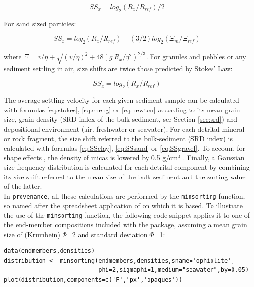 \documentclass{article}
\begin{document}
\begin{equation}
SS_x = log_2(R_x/R_{ref})/2
\label{eq:SSclay}
\end{equation}

For sand sized particles: 

\begin{equation}
SS_x = log_2(R_x/R_{ref}) - (3/2) log_2 (\Xi_m/\Xi_{ref})
\label{eq:SSsand}
\end{equation}

where $\Xi = v/\eta + \sqrt{(v/\eta)^2 + 48 (g ~
  R_x/\eta^2)^{2/3}}$. For granules and pebbles or any sediment
settling in air, size shifts are twice those predicted by Stokes' Law:

\begin{equation}
SS_x = log_2(R_x/R_{ref})
\label{eq:SSgravel}
\end{equation}

The average settling velocity for each given sediment sample can be
calculated with formulas \ref{eq:stokes}, \ref{eq:cheng} or
\ref{eq:newton} according to its mean grain size, grain density (SRD
index of the bulk sediment, see Section \ref{sec:srd}) and
depositional environment (air, freshwater or seawater). For each
detrital mineral or rock fragment, the size shift referred to the
bulk-sediment (SRD index) is calculated with formulas \ref{eq:SSclay},
\ref{eq:SSsand} or \ref{eq:SSgravel}. To account for shape effects
\citep{komar1984}, the density of micas is lowered by 0.5 g/cm$^3$
\citep{garzanti2008}. Finally, a Gaussian size-frequency distribution
is calculated for each detrital component by combining its size shift
referred to the mean size of the bulk sediment and the sorting value
of the latter.\\

In {\tt provenance}, all these calculations are performed by the
{\tt minsorting} function, so named after the spreadsheet application
of \citet{resentini2013} on which it is based. To illustrate the use
of the {\tt minsorting} function, the following code snippet applies
it to one of the end-member compositions included with the package,
assuming a mean grain size of (Krumbein) $\Phi$=2 and standard
deviation $\Phi$=1:

\begin{verbatim}
data(endmembers,densities)
distribution <- minsorting(endmembers,densities,sname='ophiolite',
                           phi=2,sigmaphi=1,medium="seawater",by=0.05)
plot(distribution,components=c('F','px','opaques'))
\end{verbatim}
\end{document}
